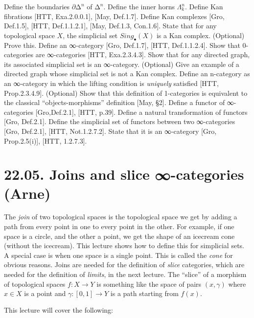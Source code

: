 \documentclass[a4paper]{amsart}
\numberwithin{figure}{section}
\theoremstyle{theorem}
\theoremstyle{definition}
\begin{document}
Define the boundaries $\partial ∆^n$ of $∆^n$. %
Define the inner horns $\Lambda^n_k$. %
Define Kan fibrations [HTT, Exa.2.0.0.1], [May, Def.1.7]. %
Define Kan complexes [Gro, Def.1.5], [HTT, Def.1.1.2.1], [May, Def.1.3, Con.1.6]. %
State that for any topological space $X$, the simplicial set $Sing_\bullet(X)$ is a Kan complex. %
(Optional) Prove this. %
Define an ∞-category [Gro, Def.1.7], [HTT, Def.1.1.2.4]. %
Show that 0-categories are ∞-categories [HTT, Exa.2.3.4.3]. %
Show that for any directed graph, its associated simplicial set is an ∞-category. %
(Optional) Give an example of a directed graph whose simplicial set is not a Kan complex. %
Define an n-category as an ∞-category in which the lifting condition is \emph{uniquely} satisfied [HTT, Prop.2.3.4.9]. %
(Optional) Show that this definition of 1-categories is equivalent to the classical ``objects-morphisms'' definition [May, §2]. %
Define a functor of ∞-categories [Gro,Def.2.1], [HTT, p.39]. %
Define a natural transformation of functors [Gro, Def.2.1]. %
Define the simplicial set of functors between two ∞-categories [Gro, Def.2.1], [HTT, Not.1.2.7.2]. %
State that it is an ∞-category [Gro, Prop.2.5(i)], [HTT, 1.2.7.3]. %


\section{22.05. Joins and slice ∞-categories (Arne)}

The \emph{join} of two topological spaces is the topological space we get by adding a path from every point in one to every point in the other. For example, if one space is a circle, and the other a point, we get the shape of an icecream cone (without the icecream). This lecture shows how to define this for simplicial sets. A special case is when one space is a single point. This is called the \emph{cone} for obvious reasons. Joins are needed for the definition of \emph{slice} categories, which are needed for the definition of \emph{limits}, in the next lecture. The ``slice'' of a morphism of topological spaces $f: X \to Y$ is something like the space of pairs $(x, \gamma)$ where $x \in X$ is a point and $\gamma: [0, 1] \to Y$ is a path starting from $f(x)$.

This lecture will cover the following: 
\end{document}
